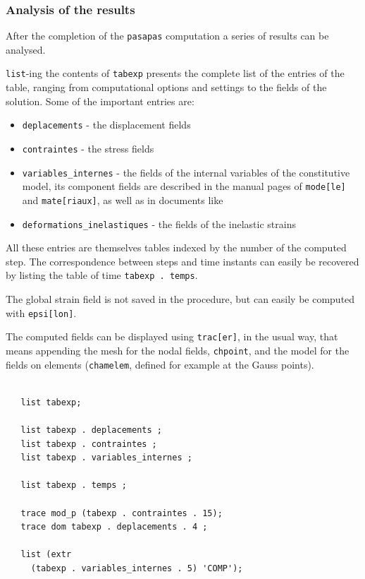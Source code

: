 \subsubsection*{Analysis of the results}

After the completion of the \texttt{pasapas} computation 
a series of results can be analysed. 

\begin{castemcom}
\texttt{list}-ing the contents of \texttt{tabexp} 
presents the complete list of the entries of the table,
ranging from computational options and settings to the
fields of the solution. Some of the important entries 
are:
\begin{itemize}

 \item \texttt{deplacements} - the displacement fields 
 \item \texttt{contraintes} - the stress fields 
 \item \texttt{variables\_internes} - the  fields of the internal variables of the 
   constitutive model, its component fields are described in the manual pages 
   of \texttt{mode[le]} and \texttt{mate[riaux]}, as well as in documents 
   like~\cite{Pasquet:1998}  
 \item \texttt{deformations\_inelastiques} - the fields of the inelastic strains 

\end{itemize}
All these entries are themselves tables indexed by the number of the 
computed step. The correspondence between steps and time instants 
can easily be recovered by listing the table of time \texttt{tabexp . temps}.  

The global strain field is not saved in the procedure, but can 
easily be computed with \texttt{epsi[lon]}.

The computed fields can be displayed  
using \texttt{trac[er]}, in the usual way, that means 
appending the mesh for the nodal fields, \texttt{chpoint},  and the 
model for the fields on elements (\texttt{chamelem}, defined for example at the Gauss points).   


\end{castemcom}
\begin{castemlines}
\begin{verbatim}

   list tabexp;

   list tabexp . deplacements ;
   list tabexp . contraintes ;
   list tabexp . variables_internes ;

   list tabexp . temps ;

   trace mod_p (tabexp . contraintes . 15);
   trace dom tabexp . deplacements . 4 ;

   list (extr
     (tabexp . variables_internes . 5) 'COMP');


\end{verbatim}
\end{castemlines}
     
